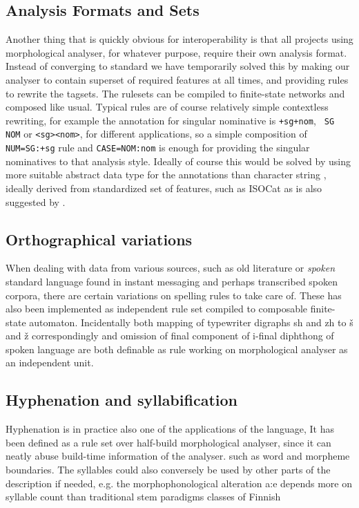 \documentclass[postprint]{flammie}
\begin{document}
\subsection{Analysis Formats and Sets}

Another thing that is quickly obvious for interoperability is that all projects
using morphological analyser, for whatever purpose, require their own analysis
format. Instead of converging to standard we have temporarily solved this by
making our analyser to contain superset of required features at all times, and
providing rules to rewrite the tagsets. The rulesets can be compiled to
finite-state networks and composed like usual. Typical rules are of course
relatively simple contextless rewriting, for example the annotation for
singular nominative is \verb|+sg+nom|, \verb| SG NOM| or \verb|<sg><nom>|, for
different applications, so a simple composition of \verb|NUM=SG:+sg| rule and
\verb|CASE=NOM:nom| is enough for providing the singular nominatives to that
analysis style.  Ideally of course this would be solved by using more suitable
abstract data type for the annotations than character string
\cite{wintner/2008}, ideally derived from standardized set of features, such as
ISOCat as is also suggested by \cite{maxwell/2008}.


\subsection{Orthographical variations}

When dealing with data from various sources, such as old literature or
\emph{spoken} standard language found in instant messaging and perhaps
transcribed spoken corpora, there are certain variations on spelling rules to
take care of. These has also been implemented as independent rule set compiled
to composable finite-state automaton. Incidentally both mapping of typewriter
digraphs sh and zh to š and ž correspondingly and omission of final component
of i-final diphthong of spoken language are both definable as rule working on
morphological analyser as an independent unit.

\subsection{Hyphenation and syllabification}

Hyphenation is in practice also one of the applications of the language, It has
been defined as a rule set over half-build morphological analyser, since it can
neatly abuse build-time information of the analyser. such as word and morpheme
boundaries. The syllables could also conversely be used by other parts of the
description if needed, e.g. the morphophonological alteration a:e depends more
on syllable count than traditional stem paradigms classes of Finnish
\end{document}
